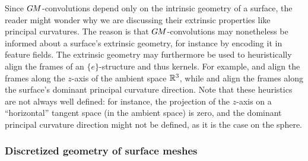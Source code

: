 Since $G\mkern-1.4muM$-convolutions depend only on the intrinsic geometry of a surface, the reader might wonder why we are discussing their extrinsic properties like principal curvatures.
The reason is that $G\mkern-1.4muM$-convolutions may nonetheless be informed about a surface's extrinsic geometry, for instance by encoding it in feature fields.
The extrinsic geometry may furthermore be used to heuristically align the frames of an $\{e\}$-structure and thus kernels.
For example, \citet{jin2018learning} and \citet{li2019crossAtlas} align the frames along the $z$-axis of the ambient space $\mathbb{R}^3$, while \citet{boscaini2016learning} and \citet{tatarchenko2018tangent} align the frames along the surface's dominant principal curvature direction.
Note that these heuristics are not always well defined:
for instance, the projection of the $z$-axis on a ``horizontal'' tangent space (in the ambient space) is zero,
and the dominant principal curvature direction might not be defined, as it is the case on the sphere.






















\subsubsection{Discretized geometry of surface meshes}
\label{sec:surfaces_geom_mesh}

